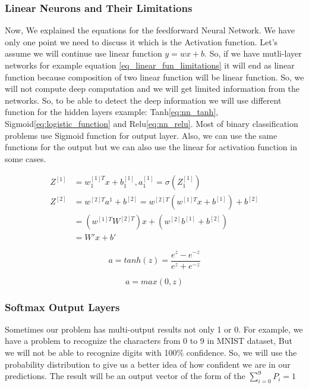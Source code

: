 \newpage
\subsubsection{Linear Neurons and Their Limitations}

Now, We explained the equations for the feedforward Neural Network. We have only one point we need to discuss it which is the Activation function. Let's assume we will continue use linear function $y= w x + b$. So, if we have mutli-layer networks for example equation \eqref{eq_linear_fun_limitations} it will end as linear function because composition of two linear function will be linear function. So, we will not compute deep computation and we will get limited information from the networks. So, to be able to detect the deep information we will use different function for the hidden layers example: Tanh\eqref{eq:nn_tanh}, Sigmoid\eqref{eq:logistic_function} and Relu\eqref{eq:nn_relu}. Most of binary classification problems use Sigmoid function for output layer. Also, we can use the same functions for the output but we can also use the linear for activation function in some cases. 

\begin{subequations}\label{eq_linear_fun_limitations}
   \begin{align}
     Z^{[1]} & = w_1^{[1]T} x + b_1^{[1]} , a_1^{[1]} = \sigma(Z_1^{[1]}) \\
     Z^{[2]} & = w^{[2]T} a^1 + b^{[2]} = w^{[2]T} (w^{[1]T}x + b^{[1]}) + b^{[2]}\\
             & = (w^{[1]T}W^{[2]T})x + (w^{[2]}b^{[1]}+ b^{[2]})\\
             & = W' x + b'
\end{align}
\end{subequations}



 
\begin{equation}\label{eq:nn_tanh}
  a = tanh(z) =\frac{e^z-e^{-z}}{e^z+e^{-z}}
\end{equation}%



\begin{equation}\label{eq:nn_relu}
  a = max (0,z)
\end{equation}%

\subsubsection{Softmax Output Layers}
Sometimes our problem has multi-output results not only 1 or 0. For example, we have a problem to recognize the characters from 0 to 9 in MNIST dataset, But we will not be able to recognize digits with 100\% confidence. So, we will use the probability distribution to give us a better idea of how confident we are in our predictions. The result will be an output vector of the form of the $\sum_{i = 0}^9P_i=1$


